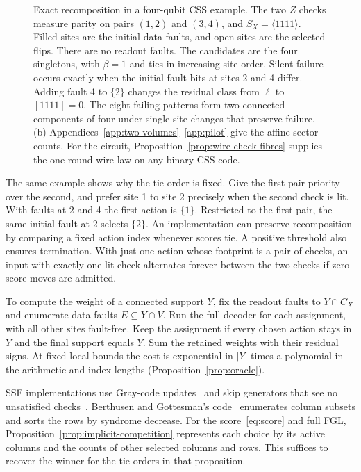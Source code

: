 \documentclass[10pt,twocolumn]{article}
\theoremstyle{definition}
\begin{document}
\begin{figure}[!htb]
\caption{Exact recomposition in a four-qubit CSS example. The two
$Z$ checks measure parity on pairs $(1,2)$ and $(3,4)$, and
$S_X=\langle1111\rangle$. Filled sites are the initial data faults,
and open sites are the selected flips. There are no readout faults.
The candidates are the four singletons, with $\beta=1$ and ties in
increasing site order.
Silent failure occurs exactly when the initial fault bits at sites
2 and 4 differ. Adding fault 4 to $\{2\}$ changes the residual class
from $\ell$ to $[1111]=0$. The eight failing patterns form two
connected components of four under single-site changes that preserve
failure. (b) Appendices~\ref{app:two-volumes}--\ref{app:pilot} give the affine sector counts. For the
circuit, Proposition~\ref{prop:wire-check-fibres} supplies the
one-round wire law on any binary CSS code.}
\label{fig:recomposition}
\end{figure}

The same example shows why the tie order is fixed. Give the first
pair priority over the second, and prefer site 1 to site 2 precisely
when the second check is lit. With faults at 2 and 4 the first
action is $\{1\}$. Restricted to the first pair, the same initial
fault at 2 selects $\{2\}$. An implementation can preserve
recomposition by comparing a fixed action index whenever scores tie.
A positive threshold also ensures termination. With just one action
whose footprint is a pair of checks, an input with exactly one lit
check alternates forever between the two checks if zero-score moves
are admitted.

To compute the weight of a connected support $Y$, fix the readout
faults to $Y\cap C_X$ and enumerate data faults $E\subseteq Y\cap V$.
Run the full decoder for each assignment, with all other sites
fault-free. Keep the assignment if every chosen action stays in $Y$
and the final support equals $Y$. Sum the retained weights with their
residual signs. At fixed local bounds the cost is exponential in $|Y|$
times a polynomial in the arithmetic and index lengths
(Proposition~\ref{prop:oracle}).

SSF implementations use Gray-code updates~\cite{GK19} and skip generators
that see no unsatisfied checks~\cite[App.~D]{SKB23}. Berthusen and
Gottesman's code~\cite{BG24} enumerates column subsets and sorts the
rows by syndrome decrease. For the score~\eqref{eq:score} and full
FGL, Proposition~\ref{prop:implicit-competition} represents each choice
by its active columns and the counts of other selected columns and rows.
This suffices to recover the winner for the tie orders in that proposition.
\end{document}
